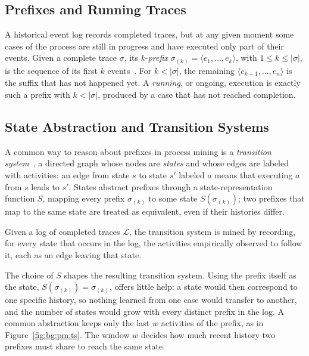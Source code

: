     \subsection{Prefixes and Running Traces}
    \label{subsec:bg:pm:prefix}
    A historical event log records completed traces, but at any given moment
    some cases of the process are still in progress and have executed only
    part of their events. Given a complete trace
    $\sigma$, its $k$-\emph{prefix} $\sigma_{(k)} = \langle e_1, \dots, e_k
    \rangle$, with $1 \le k \le |\sigma|$, is the sequence of its first $k$
    events~\cite{le2025balancing}. For $k < |\sigma|$, the
    remaining $\langle e_{k+1}, \dots, e_n \rangle$ is the suffix that has not
    happened yet. A \emph{running}, or ongoing, execution is exactly such a
    prefix with $k < |\sigma|$, produced by a case that has not reached
    completion.

    \subsection{State Abstraction and Transition Systems}
    \label{subsec:bg:pm:ts}
    A common way to reason about prefixes in process mining is a
    \emph{transition system}~\cite{vanderaalst2016}, a
    directed graph whose nodes are \emph{states} and whose edges are labeled
    with activities: an edge from state $s$ to state $s'$ labeled $a$ means
    that executing $a$ from $s$ leads to $s'$. States abstract prefixes
    through a state-representation function $S$, mapping every prefix
    $\sigma_{(k)}$ to some state $S(\sigma_{(k)})$; two prefixes that map to
    the same state are treated as equivalent, even if their histories differ.
    
    Given a log of completed traces $\mathcal{L}$, the transition system is
    mined by recording, for every state that occurs in the log, the
    activities empirically observed to follow it, each as an edge leaving
    that state.

    The choice of $S$ shapes the resulting transition system. Using the
    prefix itself as the state, $S(\sigma_{(k)}) = \sigma_{(k)}$, offers
    little help: a state would then correspond to one specific history, so
    nothing learned from one case would transfer to another, and the number
    of states would grow with every distinct prefix in the log. A common
    abstraction keeps only the last $w$ activities of the prefix, as in
    Figure~\ref{fig:bg:pm:ts}. The window $w$ decides how much recent history
    two prefixes must share to reach the same state.


